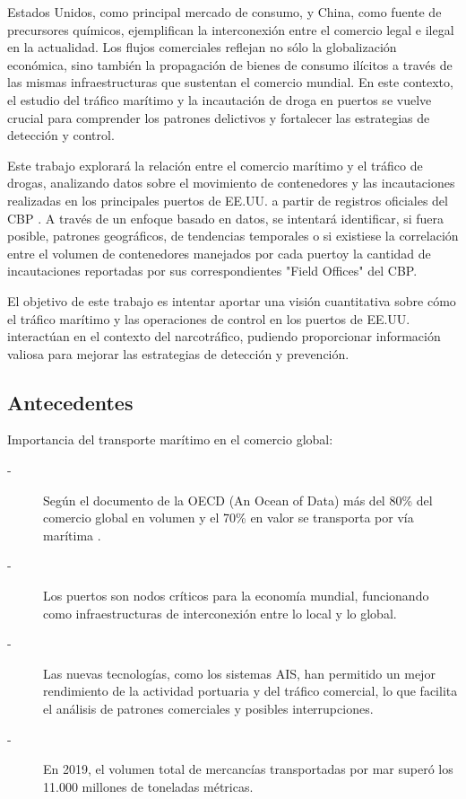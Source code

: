 \documentclass[12pt]{article}
\begin{document}
	Estados Unidos, como principal mercado de consumo, y China, como fuente de precursores químicos, ejemplifican la interconexión entre el comercio legal e ilegal en la actualidad. Los flujos comerciales reflejan no sólo la globalización económica, sino también la propagación de bienes de consumo ilícitos a través de las mismas infraestructuras que sustentan el comercio mundial. En este contexto, el estudio del tráfico marítimo y la incautación de droga en puertos se vuelve crucial para comprender los patrones delictivos y fortalecer las estrategias de detección y control.
	
	Este trabajo explorará la relación entre el comercio marítimo y el tráfico de drogas, analizando datos sobre el movimiento de contenedores y las incautaciones realizadas en los principales puertos de EE.UU. a partir de registros oficiales del CBP \cite{}. A través de un enfoque basado en datos, se intentará identificar, si fuera posible, patrones geográficos, de tendencias temporales o si existiese la correlación entre el volumen de contenedores manejados por cada puertoy la cantidad de incautaciones reportadas por sus correspondientes "Field Offices" del CBP.
	
	El objetivo de este trabajo es intentar aportar una visión cuantitativa sobre cómo el tráfico marítimo y las operaciones de control en los puertos de EE.UU. interactúan en el contexto del narcotráfico, pudiendo proporcionar información valiosa para mejorar las estrategias de detección y prevención.
	
	

	\subsection{\label{antecedentes}Antecedentes}
	Importancia del transporte marítimo en el comercio global:
	\begin{description}
		\item[-] Según el documento de la OECD (An Ocean of Data) más del 80\% del comercio global en volumen y el 70\% en valor se transporta por vía marítima \cite[]{}.
		\item[-] Los puertos son nodos críticos para la economía mundial, funcionando como infraestructuras de interconexión entre lo local y lo global.
		\item[-] Las nuevas tecnologías, como los sistemas AIS, han permitido un mejor rendimiento de la actividad portuaria y del tráfico comercial, lo que facilita el análisis de patrones comerciales y posibles interrupciones.
		\item[-] En 2019, el volumen total de mercancías transportadas por mar superó los 11.000 millones de toneladas métricas. \cite[]{https://www.cidob.org/publicaciones/infografias-transporte-maritimo-factor-clave-del-comercio-global?utm_source=chatgpt.com}
	\end{description}
	
\end{document}
